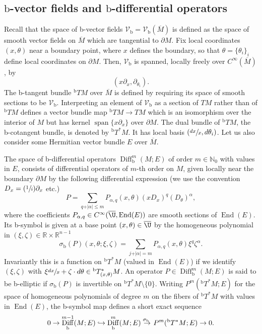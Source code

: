 \documentclass[JEP,XML,SOM,Unicode,NoFloatCountersInSection,published]{cedram}
\newcommand\hto{\mathrel{\lhook\joinrel\to}}
\newcommand{\Psfrac}[2]{(\sfrac{#1}{#2})}
\let\backslash\setminus
\theoremstyle{plain}
\theoremstyle{definition}
\newcommand {\N}{\mathbb{N}}
\newcommand{\R}{{\mathbb{R}}}
\newcommand\calV{{\mathcal V}}
\newcommand{\bb}{{\mathrm{b}}}
\DeclareMathOperator{\Diff}{Diff}
\DeclareMathOperator{\End}{End}
\DeclareMathOperator{\Span}{span}
\newcommand{\Cinf}{C^\infty}
\newcommand{\dM}{{\partial M}}
\newcommand{\Mbar}{{\overline{M}}}\let\M\Mbar
\begin{document}
\subsection{\texorpdfstring{$\bb$}{b}-vector fields and \texorpdfstring{$\bb$}{b}-differential operators} \label{subsec:bvector fields diff ops}
Recall that the space of b\nobreakdash-vector fields $\mathcal{V}_\bb = \mathcal{V}_\bb(\Mbar)$ is defined as the
space of smooth vector fields on $\Mbar$ which are tangential to $\partial M$.
Fix local coordinates $(x,\theta)$ near a boundary point, where $x$ defines the boundary, so that $\theta = \{\theta_i\}_i$ define local coordinates on $\partial M$.
Then, $\mathcal{V}_\bb$ is spanned, locally freely over $\Cinf(\Mbar)$, by
\[
(x\partial_{x}, \partial_{\theta_{i}}).
\]
The b-tangent bundle $^\bb TM$ over $\Mbar$ is defined by requiring its space of smooth sections to be
$\mathcal{V}_\bb$. Interpreting an element of $\calV_\bb$ as a section of $TM$ rather than of $^\bb TM$ defines a vector bundle map $^\bb TM\to TM$ which is an isomorphism over the interior of $M$ but has kernel $\Span\{x\partial_x\}$ over $\dM$. The dual bundle of $^\bb TM$, the b-cotangent bundle, is denoted by $^\bb T^*M$. It has local basis $(\sfrac{dx}x, d\theta_i)$.
Let us also consider some Hermitian vector bundle $E$ over $\Mbar$.

The space of b-differential operators $\Diff^{m}_\bb(M; E)$ of order $m \in \N_0$ with values in $E$,
consists of differential operators of $m$-th order on $M$, given locally near the boundary $\partial M$ by
the following differential expression (we use the convention $D_x = \Psfrac{1}{i}\partial_x$ etc.)%
\begin{equation}\label{b operator}
P = \sum_{q+ \vert \alpha\vert \leq m} P_{\alpha, q}(x,\theta)(xD_{x})^{q}(D_{\theta})^{\alpha},
\end{equation}
where the coefficients $P_{\alpha, q} \in C^\infty (\overline{\U},\End(E))$ are smooth sections of $\End(E)$.
Its b-symbol is given at a base point $(x,\theta) \in \overline{\U}$
by the homogeneous polynomial in $(\xi,\zeta)\in\R\times\R^{n-1}$
\begin{equation*}
\sigma_\bb(P)(x,\theta; \xi,\zeta) = \sum_{j+ \vert \alpha \vert = m} P_{\alpha, q}(x,\theta) \xi^{q}\zeta^{\alpha}.
\end{equation*}
Invariantly this is a function on $^\bb T^*M$ (valued in $\End(E)$) if we identify $(\xi,\zeta)$ with $\xi\sfrac{dx}x+\zeta\cdot d\theta \in {}^\bb T^*_{(x,\theta)}M$. An operator $P \in \Diff^{m}_\bb(M; E)$ is said to be b-elliptic if
$\sigma_\bb(P)$ is invertible on $^\bb T^{*}M \backslash \{0\} $. Writing $P^{m}(^\bb T^{*}M; E)$ for the space of
homogeneous polynomials of degree $m$ on the fibers of $^\bb T^{*}M$ with values in $\End(E)$, the
b-symbol map defines a short exact sequence
\begin{equation}
0 \to \Diff_\bb^{m-1}(M; E) \hto \Diff_\bb^{m}(M; E)
\overset{\sigma_\bb \ }{\to} P^{m}(^\bb T^{*}M; E) \to 0.
\end{equation}
\end{document}
